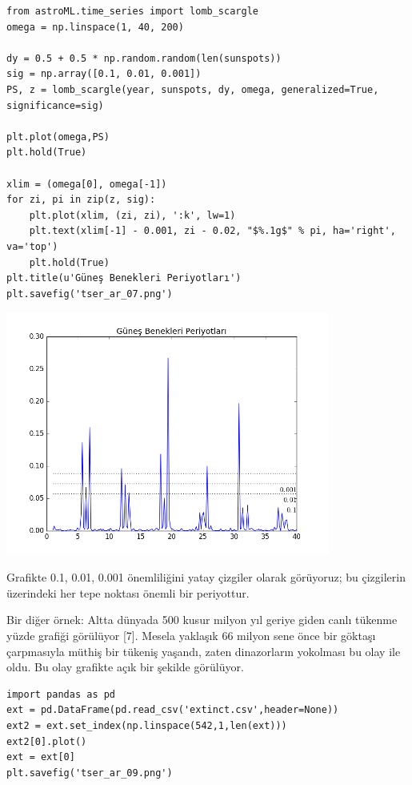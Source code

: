 \documentclass[12pt,fleqn]{article}\usepackage{../../common}
\begin{document}
\begin{verbatim}
from astroML.time_series import lomb_scargle
omega = np.linspace(1, 40, 200)

dy = 0.5 + 0.5 * np.random.random(len(sunspots))
sig = np.array([0.1, 0.01, 0.001])
PS, z = lomb_scargle(year, sunspots, dy, omega, generalized=True, significance=sig)

plt.plot(omega,PS)
plt.hold(True)

xlim = (omega[0], omega[-1])
for zi, pi in zip(z, sig):
    plt.plot(xlim, (zi, zi), ':k', lw=1)
    plt.text(xlim[-1] - 0.001, zi - 0.02, "$%.1g$" % pi, ha='right', va='top')
    plt.hold(True)
plt.title(u'Güneş Benekleri Periyotları')
plt.savefig('tser_ar_07.png')
\end{verbatim}

\includegraphics[height=8cm]{tser_ar_07.png}

Grafikte 0.1, 0.01, 0.001 önemliliğini yatay çizgiler olarak görüyoruz; bu
çizgilerin üzerindeki her tepe noktası önemli bir periyottur.

Bir diğer örnek: Altta dünyada 500 kusur milyon yıl geriye giden canlı tükenme
yüzde grafiği görülüyor [7]. Mesela yaklaşık 66 milyon sene önce bir göktaşı
çarpmasıyla müthiş bir tükeniş yaşandı, zaten dinazorların yokolması bu olay ile
oldu. Bu olay grafikte açık bir şekilde görülüyor.

\begin{verbatim}
import pandas as pd
ext = pd.DataFrame(pd.read_csv('extinct.csv',header=None))
ext2 = ext.set_index(np.linspace(542,1,len(ext)))
ext2[0].plot()
ext = ext[0]
plt.savefig('tser_ar_09.png')
\end{verbatim}
\end{document}
